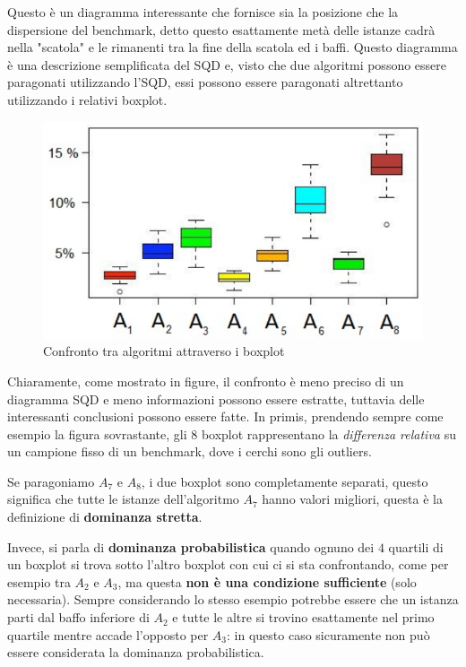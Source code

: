 \documentclass{article}
\begin{document}
Questo è un diagramma interessante che fornisce sia la posizione che la dispersione del benchmark,
detto questo esattamente metà delle istanze cadrà nella "scatola" e le rimanenti tra la fine
della scatola ed i baffi. Questo diagramma è una descrizione semplificata del SQD e, visto che due
algoritmi possono essere paragonati utilizzando l'SQD, essi possono essere paragonati altrettanto
utilizzando i relativi boxplot.
\begin{figure}[H]
    \centering
    \includegraphics[scale=0.5]{images/boxplot_comparison.png}
    \caption{Confronto tra algoritmi attraverso i boxplot}
\end{figure}
Chiaramente, come mostrato in figure, il confronto è meno preciso di un diagramma SQD e meno
informazioni possono essere estratte, tuttavia delle interessanti conclusioni possono essere fatte.
In primis, prendendo sempre come esempio la figura sovrastante, gli $8$ boxplot rappresentano la
\textit{differenza relativa} su un campione fisso di un benchmark, dove i cerchi sono gli outliers.

Se paragoniamo $A_7$ e $A_8$, i due boxplot sono completamente separati, questo significa che tutte
le istanze dell'algoritmo $A_7$ hanno valori migliori, questa è la definizione di \textbf{dominanza stretta}.

Invece, si parla di \textbf{dominanza probabilistica} quando ognuno dei $4$ quartili di un boxplot
si trova sotto l'altro boxplot con cui ci si sta confrontando, come per esempio tra $A_2$ e $A_3$,
ma questa \textbf{non è una condizione sufficiente} (solo necessaria). Sempre considerando lo
stesso esempio potrebbe essere che un istanza parti dal baffo inferiore di $A_2$ e tutte le altre
si trovino esattamente nel primo quartile mentre accade l'opposto per $A_3$: in questo caso sicuramente
non può essere considerata la dominanza probabilistica.
\end{document}
